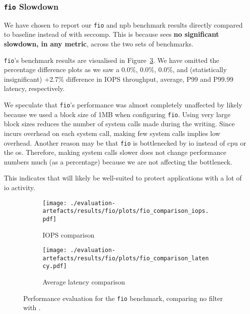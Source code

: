 \subsubsection{\texttt{fio} Slowdown}\label{subsubsec:fio-slowdown}

We have chosen to report our \texttt{fio} and \ac{npb} benchmark results directly
compared to baseline instead of with seccomp. This is because \af
sees \textbf{no significant slowdown, in any metric}, across the two sets of
benchmarks. 

\texttt{fio}'s benchmark results are visualised in Figure~\ref{fig:fio-perf}.
We have omitted the percentage difference plots as we saw a 0.0\%, 0.0\%, 0.0\%, and
(statistically insignificant) +2.7\% difference in IOPS throughput, average,
P99 and P99.99 latency, respectively. 

We speculate that \texttt{fio}'s performance was almost completely
unaffected by \af likely because we used a block size of 1MB when
configuring \texttt{fio}. Using very large block sizes reduces the number of
system calls made during the writing. Since \af incurs overhead on each
system call, making few system calls implies low overhead. Another reason
may be that \texttt{fio} is bottlenecked by \ac{io} instead of \ac{cpu} or
the \ac{os}. Therefore, making system calls slower does not change performance
numbers much (as a percentage) because we are not affecting the bottleneck.

This indicates that \af will likely be well-suited to protect applications with
a lot of \ac{io} activity.

\begin{figure}[htbp]
    \centering
    \begin{subfigure}[b]{0.48\textwidth}
        \centering
        \texttt{[image: ./evaluation-artefacts/results/fio/plots/fio\_comparison\_iops.pdf]}
        \caption{IOPS comparison}
        \label{fig:fio-iops}
    \end{subfigure}
    \hfill %
    \begin{subfigure}[b]{0.48\textwidth}
        \centering
        \texttt{[image: ./evaluation-artefacts/results/fio/plots/fio\_comparison\_latency.pdf]}
        \caption{Average latency comparison}
        \label{fig:fio-latency}
    \end{subfigure}

    \medskip %
    
    \caption{Performance evaluation for the \texttt{fio} benchmark, comparing no
    filter with \af{}.} %
    \label{fig:fio-perf}
\end{figure}



